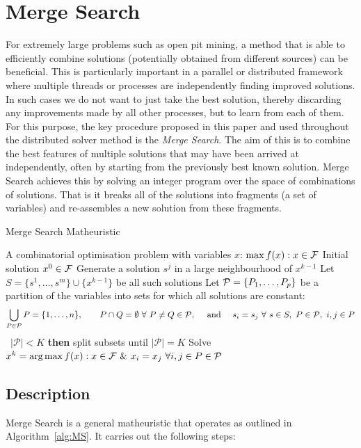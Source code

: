 \documentclass[journal]{IEEEtran}
\begin{document}
\section{Merge Search}\label{sec:MS}
For extremely large problems such as open pit mining, a method that is able to efficiently combine solutions (potentially obtained from different sources) can be beneficial. This is particularly important in a parallel or distributed framework where multiple threads or processes are independently finding improved solutions. In such cases we do not want to just take the best solution, thereby discarding any improvements made by all other processes, but to learn from each of them. For this purpose, the key procedure proposed in this paper and used throughout 
the distributed solver method is the {\it Merge Search}. The aim of this is to combine the best features of multiple solutions that may have been 
arrived at independently, often by starting from the previously best known solution. Merge Search achieves this by solving an integer program over the space of combinations of solutions. That is it breaks all of the solutions into fragments (a set of variables) and re-assembles a new solution from these fragments. 

\begin{algorithm}[htb!]
\caption{{\sf Merge Search Matheuristic}} \label{alg:MS}
\begin{algorithmic}[1]
  \Require A combinatorial optimisation problem with variables $x$: $\max f(x) : x\in {\cal F}$
  \Require Initial solution $x^0\in \cal F$
    \State Generate a solution $s^j$ in a large neighbourhood of $x^{k-1}$
    \label{step:nbhd}
      \EndFor
    \State Let  $S=\{s^1,\ldots,s^m\}\cup\{x^{k-1}\}$ be all such solutions
    \State Let ${\cal P}=\{P_1,\ldots,P_p\}$ be a partition of the variables into sets for which all solutions are constant:\label{step:P}
  $$ \bigcup_{P\in {\cal P}} P=\{1,\ldots,n\},\qquad P \cap Q=\emptyset\ \forall\ P\ne Q\in
  {\cal P},\quad \text{ and }\quad
  s_i = s_j \ \forall\ s\in S,\ P\in {\cal P},\ i,j\in P$$
   \ {$|\mathcal{P}| < K$} {\bf then} split subsets until $|\mathcal{P}|=K$ \label{step:RandSplit}
  \State Solve $x^k=\text{arg}\max f(x) : x\in {\cal F}\ \&\ x_i=x_j\ \forall
  i,j\in P\in{\cal P}$\label{step:merge}
\EndFor
\end{algorithmic}
\end{algorithm}

\subsection{Description}
Merge Search is a general matheuristic that operates
as outlined in Algorithm~\ref{alg:MS}. It carries out the following steps:
\end{document}
